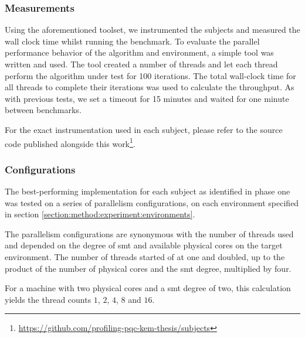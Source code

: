 \subsubsection{Measurements}
\label{section:method:experiment:phase2:measurements}

Using the aforementioned toolset, we instrumented the subjects and measured the wall clock time whilst running the benchmark. To evaluate the parallel performance behavior of the algorithm and environment, a simple tool was written and used. The tool created a number of threads and let each thread perform the algorithm under test for 100 iterations. The total wall-clock time for all threads to complete their iterations was used to calculate the throughput. As with previous tests, we set a timeout for 15 minutes and waited for one minute between benchmarks.

For the exact instrumentation used in each subject, please refer to the source code published alongside this work\footnote{\href{https://github.com/profiling-pqc-kem-thesis/subjects}{https://github.com/profiling-pqc-kem-thesis/subjects}}.

\subsubsection{Configurations}
\label{section:method:experiment:phase2:configurations}

The best-performing implementation for each subject as identified in phase one was tested on a series of parallelism configurations, on each environment specified in section \ref{section:method:experiment:environments}.

The parallelism configurations are synonymous with the number of threads used and depended on the degree of \gls{smt} and available physical cores on the target environment. The number of threads started of at one and doubled, up to the product of the number of physical cores and the \gls{smt} degree, multiplied by four.

For a machine with two physical cores and a \gls{smt} degree of two, this calculation yields the thread counts $1$, $2$, $4$, $8$ and $16$.